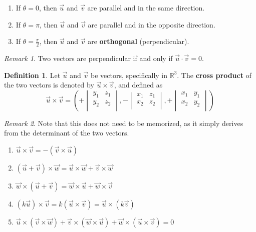\documentclass[11pt]{article}
\theoremstyle{plain} %
\theoremstyle{definition}
\newtheorem*{definition}{Definition} %
\theoremstyle{example}
\theoremstyle{remark}
\newtheorem*{remark}{Remark}
\begin{document}
\begin{enumerate}
	\item If $\theta = 0$, then $\vec{u}$ and $\vec{v}$ are parallel and in the same direction.
	\item If $\theta = \pi$, then $\vec{u}$ and $\vec{v}$ are parallel and in the opposite direction.
	\item If $\theta =\frac{ \pi}{2}$, then $\vec{u}$ and $\vec{v}$ are \textbf{orthogonal} (perpendicular).
\end{enumerate}

\begin{remark}
Two vectors are perpendicular if and only if $\vec{u} \cdot \vec{v} = 0$.
\end{remark}

\begin{definition}
Let $\vec{u} $ and $\vec{v} $ be vectors, specifically in $\mathbb R^3$. The \textbf{cross product} of the two vectors is denoted by $\vec{u}\times\vec{v}$, and defined as $$\vec{u}\times\vec{v} = \left(+\begin{vmatrix}
  	y_{1} & z_{1}\\
  	y_{2} & z_{2}\\
  	\end{vmatrix}, -\begin{vmatrix}
  	x_{1} & z_{1}\\
  	x_{2} & z_{2}\\
  	\end{vmatrix},+ \begin{vmatrix}
  	x_{1} & y_{1}\\
  	x_{2} & y_{2}\\
  	\end{vmatrix}\right)$$
\end{definition}

\begin{remark}
Note that this does not need to be memorized, as it simply derives from the determinant of the two vectors.
\end{remark}

\begin{enumerate}
	\item $\vec{u} \times \vec{v} = -(\vec{v}\times\vec{u})$
	\item $(\vec{u}+\vec{v})\times \vec{w} = \vec{u}\times\vec{w} + \vec{v}\times\vec{w}$
	\item $ \vec{w}\times(\vec{u}+\vec{v}) = \vec{w}\times\vec{u} + \vec{w}\times\vec{v}$
	\item $(k\vec{u})\times\vec{v} = k(\vec{u}\times\vec{v}) = \vec{u}\times(k\vec{v})$
	\item $\vec{u} \times (\vec{v}\times\vec{w}) + \vec{v} \times (\vec{w}\times\vec{u}) + \vec{w} \times (\vec{u}\times\vec{v}) = 0$
	
\end{enumerate}
\end{document}
